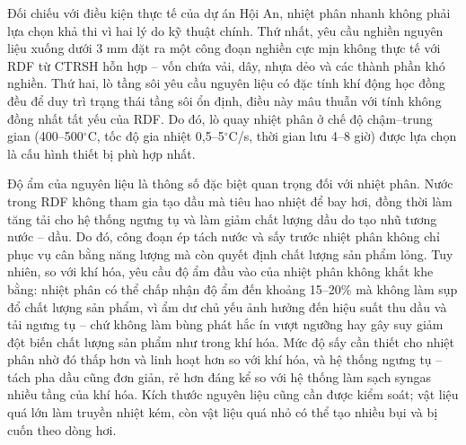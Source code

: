 \documentclass[../main.tex]{subfiles}
\begin{document}
Đối chiếu với điều kiện thực tế của dự án Hội An, nhiệt phân nhanh không phải lựa chọn khả thi vì hai lý do kỹ thuật chính. Thứ nhất, yêu cầu nghiền nguyên liệu xuống dưới 3 mm đặt ra một công đoạn nghiền cực mịn không thực tế với RDF từ CTRSH hỗn hợp -- vốn chứa vải, dây, nhựa dẻo và các thành phần khó nghiền. Thứ hai, lò tầng sôi yêu cầu nguyên liệu có đặc tính khí động học đồng đều để duy trì trạng thái tầng sôi ổn định, điều này mâu thuẫn với tính không đồng nhất tất yếu của RDF. Do đó, lò quay nhiệt phân ở chế độ chậm--trung gian (400--500$^{\circ}$C, tốc độ gia nhiệt 0{,}5--5$^{\circ}$C/s, thời gian lưu 4--8 giờ) được lựa chọn là cấu hình thiết bị phù hợp nhất.

Độ ẩm của nguyên liệu là thông số đặc biệt quan trọng đối với nhiệt phân. Nước trong RDF không tham gia tạo dầu mà tiêu hao nhiệt để bay hơi, đồng thời làm tăng tải cho hệ thống ngưng tụ và làm giảm chất lượng dầu do tạo nhũ tương nước -- dầu. Do đó, công đoạn ép tách nước và sấy trước nhiệt phân không chỉ phục vụ cân bằng năng lượng mà còn quyết định chất lượng sản phẩm lỏng. Tuy nhiên, so với khí hóa, yêu cầu độ ẩm đầu vào của nhiệt phân không khắt khe bằng: nhiệt phân có thể chấp nhận độ ẩm đến khoảng 15--20\% mà không làm sụp đổ chất lượng sản phẩm, vì ẩm dư chủ yếu ảnh hưởng đến hiệu suất thu dầu và tải ngưng tụ -- chứ không làm bùng phát hắc ín vượt ngưỡng hay gây suy giảm đột biến chất lượng sản phẩm như trong khí hóa. Mức độ sấy cần thiết cho nhiệt phân nhờ đó thấp hơn và linh hoạt hơn so với khí hóa, và hệ thống ngưng tụ -- tách pha dầu cũng đơn giản, rẻ hơn đáng kể so với hệ thống làm sạch syngas nhiều tầng của khí hóa. Kích thước nguyên liệu cũng cần được kiểm soát; vật liệu quá lớn làm truyền nhiệt kém, còn vật liệu quá nhỏ có thể tạo nhiều bụi và bị cuốn theo dòng hơi.
\end{document}

